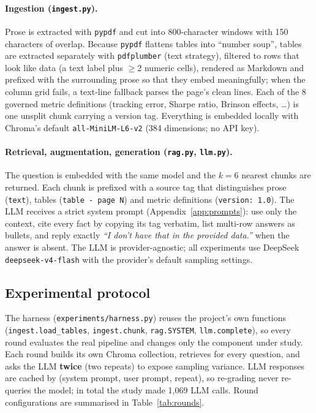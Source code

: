 \documentclass[11pt,a4paper]{article}
\begin{document}
\paragraph{Ingestion (\texttt{ingest.py}).}
Prose is extracted with \texttt{pypdf} and cut into 800-character windows with 150 characters of overlap. Because
\texttt{pypdf} flattens tables into ``number soup'', tables are extracted separately with \texttt{pdfplumber}
(text strategy), filtered to rows that look like data (a text label plus $\geq$2 numeric cells), rendered as
Markdown and prefixed with the surrounding prose so that they embed meaningfully; when the column grid fails, a
text-line fallback parses the page's clean lines. Each of the 8 governed metric definitions (tracking error,
Sharpe ratio, Brinson effects, \ldots) is one unsplit chunk carrying a version tag. Everything is embedded locally
with Chroma's default \texttt{all-MiniLM-L6-v2} (384 dimensions; no API key).

\paragraph{Retrieval, augmentation, generation (\texttt{rag.py}, \texttt{llm.py}).}
The question is embedded with the same model and the $k=6$ nearest chunks are returned. Each chunk is prefixed with
a source tag that distinguishes prose (\texttt{text}), tables (\texttt{table - page N}) and metric definitions
(\texttt{version: 1.0}). The LLM receives a strict system prompt (Appendix~\ref{app:prompts}): use only the
context, cite every fact by copying its tag verbatim, list multi-row answers as bullets, and reply exactly
\emph{``I don't have that in the provided data.''} when the answer is absent. The LLM is provider-agnostic; all
experiments use DeepSeek \texttt{deepseek-v4-flash} with the provider's default sampling settings.

\subsection{Experimental protocol}
The harness (\texttt{experiments/harness.py}) reuses the project's own functions (\texttt{ingest.load\_tables},
\texttt{ingest.chunk}, \texttt{rag.SYSTEM}, \texttt{llm.complete}), so every round evaluates the real pipeline and
changes only the component under study. Each round builds its own Chroma collection, retrieves for every question,
and asks the LLM \textbf{twice} (two repeats) to expose sampling variance. LLM responses are cached by
(system prompt, user prompt, repeat), so re-grading never re-queries the model; in total the study made
1{,}069 LLM calls. Round configurations are summarised in Table~\ref{tab:rounds}.
\end{document}
